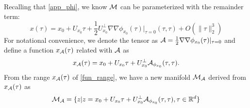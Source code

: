 \documentclass{article}
\newtheorem{theorem}{Theorem}[section]
\theoremstyle{remark}
\begin{document}
%
Recalling that \eqref{app_phi}, we know $\cal M$ can be parameterized with the remainder term:
\[
 x(\tau)= x_0+ U_{x_0} \tau + \frac{1}{2} U_{x_0}^{\perp}{\nabla\nabla\phi_{x_0}(\tau)|_{\tau=0}}(\tau, \tau)+O(\|\tau\|_2^3)
\]
For notational convenience, we denote the tensor as ${\cal A}=\frac{1}{2} {\nabla\nabla\phi_{x_0}(\tau)|_{\tau=0}}$ and define a function $x_{\cal A}(\tau)$ related with $\cal A$ as
\begin{equation}\label{fun_range}
x_{\cal A}(\tau) = x_0+ U_{x_0} \tau + U_{x_0}^{\perp} {\cal A}_{\phi_{x_0}}(\tau, \tau).
\end{equation}
From the range $x_{\cal A}(\tau)$ of \eqref{fun_range}, we have a new manifold ${\cal M_A}$ derived from $x_{\cal A}(\tau)$ as
\begin{equation}\label{M_a}
{\cal M_A} = \{ z| z =  x_0+ U_{x_0} \tau + U_{x_0}^{\perp} {\cal A}_{\phi_{x_0}}(\tau, \tau), \tau \in {\mathbb R}^d\}
\end{equation}
\end{document}
